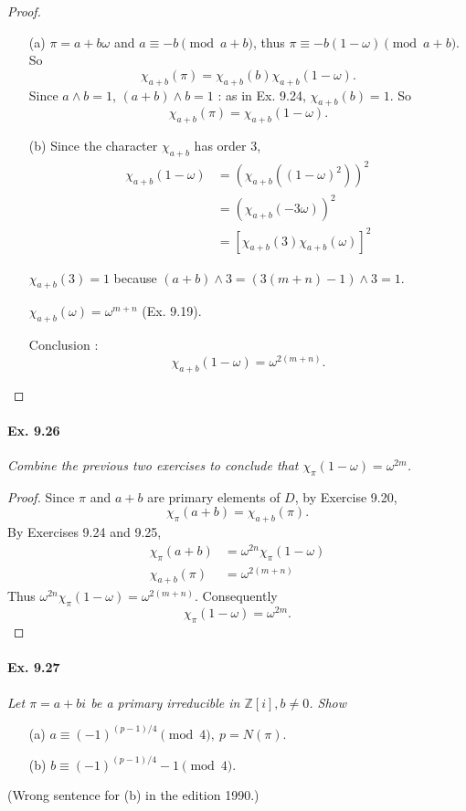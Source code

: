 \documentclass[11pt,a4paper]{article}
\newcommand{\Z}{\mathbb{Z}}
\begin{document}
\begin{proof}
\begin{enumerate}
\item[(a)] $\pi = a + b \omega$ and $a \equiv -b \pmod {a+b}$, thus $\pi \equiv -b(1-\omega) \pmod {a+b}$. So
$$\chi_{a+b}(\pi) = \chi_{a+b}(b) \chi_{a+b}(1-\omega).$$
Since $a \wedge b = 1$, $(a+b) \wedge b = 1$ : as in Ex. 9.24, $\chi_{a+b}(b) = 1$. So
$$\chi_{a+b}(\pi) =  \chi_{a+b}(1-\omega).$$
\item[(b)] Since the character $\chi_{a+b}$ has order 3,
\begin{align*}
\chi_{a+b}(1-\omega) &= (\chi_{a+b}((1-\omega)^2))^2\\
&=(\chi_{a+b}(-3\omega))^2\\
&=[\chi_{a+b}(3) \chi_{a+b}(\omega)]^2
\end{align*}

$\chi_{a+b}(3) = 1$ because $(a+b) \wedge 3 = (3(m+n)-1) \wedge 3 = 1$.

$\chi_{a+b}(\omega) = \omega^{m+n}$ (Ex. 9.19).

Conclusion : $$\chi_{a+b}(1-\omega) = \omega^{2(m+n)}.$$ 
\end{enumerate}
\end{proof}

\paragraph{Ex. 9.26}

{\it Combine the previous two exercises to conclude that $\chi_\pi(1-\omega) = \omega^{2m}$.
}

\begin{proof}
Since $\pi$ and $a+b$ are primary elements of $D$, by Exercise 9.20,
$$\chi_\pi(a+b) = \chi_{a+b}(\pi).$$
By Exercises 9.24 and 9.25,
\begin{align*}
\chi_\pi(a+b) &= \omega^{2n} \chi_\pi(1-\omega)\\
\chi_{a+b}(\pi) &= \omega^{2(m+n)}
\end{align*}
Thus $\omega^{2n} \chi_\pi(1-\omega) = \omega^{2(m+n)}$.
Consequently
$$\chi_\pi(1-\omega) = \omega^{2m}.$$
\end{proof}

\paragraph{Ex. 9.27}

{\it Let $\pi = a+bi$ be a primary irreducible in $\Z[i], b\ne 0$. Show
\begin{enumerate}
\item[(a)] $a \equiv (-1)^{(p-1)/4} \pmod 4,\ p = N(\pi)$.
\item[(b)] $b \equiv (-1)^{(p-1)/4} - 1 \pmod 4$.
\end{enumerate}
(Wrong sentence for (b) in the edition 1990.)
}
\end{document}
